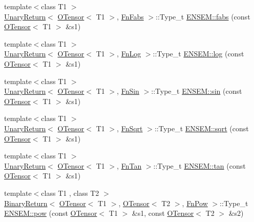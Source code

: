 \begin{DoxyCompactItemize}
\item 
{\footnotesize template$<$class T1 $>$ }\\\mbox{\hyperlink{structENSEM_1_1UnaryReturn}{Unary\+Return}}$<$ \mbox{\hyperlink{classENSEM_1_1OTensor}{O\+Tensor}}$<$ T1 $>$, \mbox{\hyperlink{structENSEM_1_1FnFabs}{Fn\+Fabs}} $>$\+::Type\+\_\+t \mbox{\hyperlink{group__obstensor_ga246cc858f35ed63a911bfa33abd22d98}{E\+N\+S\+E\+M\+::fabs}} (const \mbox{\hyperlink{classENSEM_1_1OTensor}{O\+Tensor}}$<$ T1 $>$ \&s1)
\item 
{\footnotesize template$<$class T1 $>$ }\\\mbox{\hyperlink{structENSEM_1_1UnaryReturn}{Unary\+Return}}$<$ \mbox{\hyperlink{classENSEM_1_1OTensor}{O\+Tensor}}$<$ T1 $>$, \mbox{\hyperlink{structENSEM_1_1FnLog}{Fn\+Log}} $>$\+::Type\+\_\+t \mbox{\hyperlink{group__obstensor_ga256d486f79c6bee5428762a951322949}{E\+N\+S\+E\+M\+::log}} (const \mbox{\hyperlink{classENSEM_1_1OTensor}{O\+Tensor}}$<$ T1 $>$ \&s1)
\item 
{\footnotesize template$<$class T1 $>$ }\\\mbox{\hyperlink{structENSEM_1_1UnaryReturn}{Unary\+Return}}$<$ \mbox{\hyperlink{classENSEM_1_1OTensor}{O\+Tensor}}$<$ T1 $>$, \mbox{\hyperlink{structENSEM_1_1FnSin}{Fn\+Sin}} $>$\+::Type\+\_\+t \mbox{\hyperlink{group__obstensor_gaa4e4751f0d9a575eaac0fb52f7bb0c73}{E\+N\+S\+E\+M\+::sin}} (const \mbox{\hyperlink{classENSEM_1_1OTensor}{O\+Tensor}}$<$ T1 $>$ \&s1)
\item 
{\footnotesize template$<$class T1 $>$ }\\\mbox{\hyperlink{structENSEM_1_1UnaryReturn}{Unary\+Return}}$<$ \mbox{\hyperlink{classENSEM_1_1OTensor}{O\+Tensor}}$<$ T1 $>$, \mbox{\hyperlink{structENSEM_1_1FnSqrt}{Fn\+Sqrt}} $>$\+::Type\+\_\+t \mbox{\hyperlink{group__obstensor_gab4101323c19945bf42cbece4b0c2e8b4}{E\+N\+S\+E\+M\+::sqrt}} (const \mbox{\hyperlink{classENSEM_1_1OTensor}{O\+Tensor}}$<$ T1 $>$ \&s1)
\item 
{\footnotesize template$<$class T1 $>$ }\\\mbox{\hyperlink{structENSEM_1_1UnaryReturn}{Unary\+Return}}$<$ \mbox{\hyperlink{classENSEM_1_1OTensor}{O\+Tensor}}$<$ T1 $>$, \mbox{\hyperlink{structENSEM_1_1FnTan}{Fn\+Tan}} $>$\+::Type\+\_\+t \mbox{\hyperlink{group__obstensor_gaaea33431d7f292c563a371d23c31eb07}{E\+N\+S\+E\+M\+::tan}} (const \mbox{\hyperlink{classENSEM_1_1OTensor}{O\+Tensor}}$<$ T1 $>$ \&s1)
\item 
{\footnotesize template$<$class T1 , class T2 $>$ }\\\mbox{\hyperlink{structENSEM_1_1BinaryReturn}{Binary\+Return}}$<$ \mbox{\hyperlink{classENSEM_1_1OTensor}{O\+Tensor}}$<$ T1 $>$, \mbox{\hyperlink{classENSEM_1_1OTensor}{O\+Tensor}}$<$ T2 $>$, \mbox{\hyperlink{structENSEM_1_1FnPow}{Fn\+Pow}} $>$\+::Type\+\_\+t \mbox{\hyperlink{group__obstensor_ga94691b9c2a192ce60f55f93a4ccf1974}{E\+N\+S\+E\+M\+::pow}} (const \mbox{\hyperlink{classENSEM_1_1OTensor}{O\+Tensor}}$<$ T1 $>$ \&s1, const \mbox{\hyperlink{classENSEM_1_1OTensor}{O\+Tensor}}$<$ T2 $>$ \&s2)

\end{DoxyCompactItemize}
